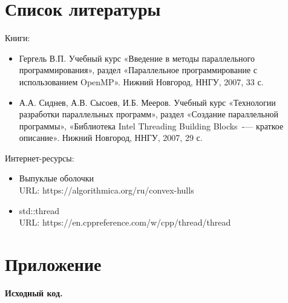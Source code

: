 \documentclass{report}
\begin{document}
\newpage

\section{Список литературы}

Книги:

\begin{itemize}
\item Гергель В.П. Учебный курс «Введение в методы параллельного программирования», раздел «Параллельное программирование с использованием OpenMP». Нижний Новгород, ННГУ, 2007, 33 с.
\item А.А. Сиднев, А.В. Сысоев, И.Б. Мееров. Учебный курс «Технологии разработки параллельных программ», раздел «Создание параллельной программы», «Библиотека Intel Threading Building Blocks~-— краткое описание». Нижний Новгород, ННГУ, 2007, 29 с.
\end{itemize}

\par Интернет-ресурсы:

\begin{itemize}
\item Выпуклые оболочки \\ URL: https://algorithmica.org/ru/convex-hulls
\item std::thread \\ URL: https://en.cppreference.com/w/cpp/thread/thread
\end{itemize}

\newpage

\section{Приложение}

\centerline{\bfseries Исходный код.} 








\end{document}

